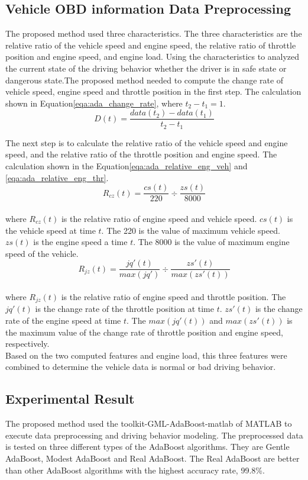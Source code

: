 \subsection{Vehicle OBD information Data Preprocessing}
The proposed method used three characteristics. The three characteristics are the relative ratio of the vehicle speed and engine speed, the relative ratio of throttle position and engine speed, and engine load. Using the characteristics to analyzed the current state of the driving behavior whether the driver is in safe state or dangerous state.The proposed method needed to compute the change rate of vehicle speed, engine speed and throttle position in the first step. The calculation shown in Equation\eqref{eqa:ada_change_rate}, where $t_{2} - t_{1} = 1$.\\
\begin{equation}
\label{eqa:ada_change_rate}
D(t) = \dfrac{data(t_{2})-data(t_{1})}{t_{2}-t_{1}}
\end{equation}

The next step is to calculate the relative ratio of the vehicle speed and engine speed, and the relative ratio of the throttle position and engine speed. The calculation shown in the Equation\eqref{eqa:ada_relative_eng_veh} and \eqref{eqa:ada_relative_eng_thr}. \\
\begin{equation}
\label{eqa:ada_relative_eng_veh}
R_{cz}(t) = \dfrac{cs(t)}{220} \div \dfrac{zs(t)}{8000}
\end{equation}
\\
where $R_{cz}(t)$ is the relative ratio of engine speed and vehicle speed. $cs(t)$ is the vehicle speed at time $t$. The 220 is the value of maximum vehicle speed. $zs(t)$ is the engine speed a time $t$. The 8000 is the value of maximum engine speed of the vehicle.\\

\begin{equation}
\label{eqa:ada_relative_eng_thr}
R_{jz}(t) = \dfrac{jq'(t)}{max(jq')} \div \dfrac{zs'(t)}{max(zs'(t))}
\end{equation}
\\
where $R_{jz}(t)$ is the relative ratio of engine speed and throttle position. The $jq'(t)$ is the change rate of the throttle position at time $t$. $zs'(t)$ is the change rate of the engine speed at time $t$. The $max(jq'(t))$ and $max(zs'(t))$ is the maximum value of the change rate of throttle position and engine speed, respectively.\\

Based on the two computed features and engine load, this three features were combined to determine the vehicle data is normal or bad driving behavior.

\subsection{Experimental Result}
The proposed method used the toolkit-GML-AdaBoost-matlab of MATLAB to execute data preprocessing and driving behavior modeling. The preprocessed data is tested on three different types of the AdaBoost algorithms. They are Gentle AdaBoost, Modest AdaBoost and Real AdaBoost. The Real AdaBoost are better than other AdaBoost algorithms with the highest accuracy rate, 99.8\%.